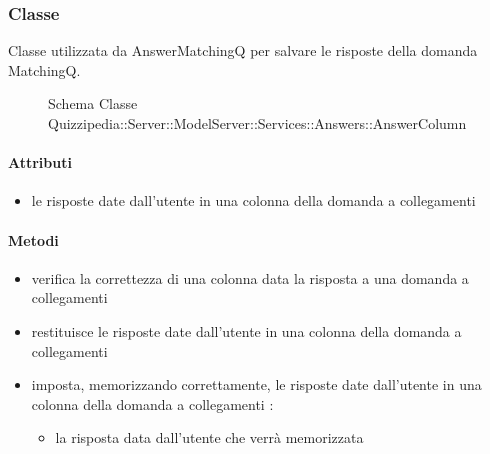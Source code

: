 \subsubsection{Classe }
Classe utilizzata da AnswerMatchingQ per salvare le risposte della domanda MatchingQ.
\begin{figure}[H]
\centering
\noindent{}
\caption[Schema Classe AnswerColumn]{Schema Classe Quizzipedia::Server::ModelServer::Services::Answers::AnswerColumn}
\end{figure}
\paragraph{Attributi}
\begin{itemize}
\item {}
\newline
le risposte date dall'utente in una colonna della domanda a collegamenti
\end{itemize}
\paragraph{Metodi}
\begin{itemize}
\item {}
\newline
verifica la correttezza di una colonna data la risposta a una domanda a collegamenti
\newline
\item {}
\newline
restituisce le risposte date dall'utente in una colonna della domanda a collegamenti
\newline
\item {}
\newline
imposta, memorizzando correttamente, le risposte date dall'utente in una colonna della domanda a collegamenti
\newline
{} :
\begin{itemize}
\item {}
\newline
la risposta data dall'utente che verrà memorizzata
\end{itemize}
\end{itemize}
